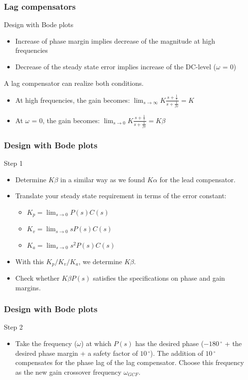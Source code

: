 		

\begin{frame}
	\frametitle{Lag compensators}
	\begin{block}{Design with Bode plots}
		\begin{itemize}
		\item Increase of phase margin implies decrease of the magnitude at high frequencies 
		\item Decrease of the steady state error implies increase of the DC-level ($\omega$ = 0)
		\end{itemize}
		A lag compensator can realize both conditions.
		\begin{itemize}
			\item At high frequencies, the gain becomes:
			$\lim_{s \to \infty} K\frac{s + \frac{1}{\tau}}{s + \frac{1}{\beta\tau}} = K$ 
			\item At $\omega$ = 0, the gain becomes: $\lim_{s \to 0} K\frac{s + \frac{1}{\tau}}{s + \frac{1}{\beta\tau}} = K\beta$
		\end{itemize}
	\end{block}
\end{frame}


\begin{frame}
\frametitle{Design with Bode plots}
\begin{block}{Step 1}
	\begin{itemize}
	\item Determine $K\beta$ in a similar way as we found $K\alpha$ for the lead compensator.
	\item Translate your steady state requirement in terms of the error constant:
	\begin{itemize}
		\item $K_p = \lim_{s \to 0} P(s)C(s)$
		\item $K_v = \lim_{s \to 0} sP(s)C(s)$
		\item $K_a = \lim_{s \to 0} s^2P(s)C(s)$
	\end{itemize}
	\item With this $K_p/K_v/K_a$, we determine $K\beta$.
	\item Check whether $K\beta P(s)$ satisfies the specifications on phase and gain margins.
	\end{itemize}
\end{block}
\end{frame}

\begin{frame}
\frametitle{Design with Bode plots}
\begin{block}{Step 2}
	\begin{itemize}
	\item Take the frequency ($\omega$) at which $P(s)$ has the desired phase ($-180\,^{\circ}$ + the desired phase margin + a safety factor of $10\,^{\circ}$). The addition of $10\,^{\circ}$ compensates for the phase lag of the lag compensator. Choose this frequency as the new gain crossover frequency $\omega_{GCF}$.
	\end{itemize}
\end{block}
\end{frame}

